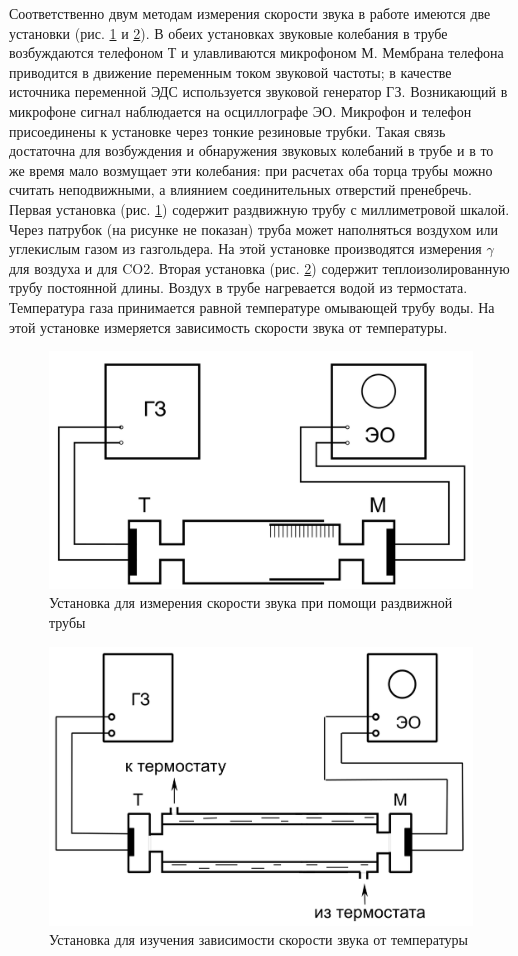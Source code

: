 \documentclass[a4paper,12pt]{article}
\begin{document}
Соответственно двум методам измерения скорости звука в работе имеются две установки (рис. \ref{img:ustan-1} и \ref{img:ustan-2}). В обеих установках звуковые колебания в трубе возбуждаются телефоном Т и улавливаются микрофоном М. Мембрана телефона приводится в движение переменным током звуковой частоты; в качестве источника переменной ЭДС используется звуковой генератор ГЗ. Возникающий в микрофоне сигнал наблюдается на осциллографе ЭО. Микрофон и телефон присоединены к установке через тонкие резиновые трубки. Такая связь достаточна для возбуждения и обнаружения звуковых колебаний в трубе и в то же время мало возмущает эти колебания: при расчетах оба торца трубы можно считать неподвижными, а влиянием соединительных отверстий пренебречь. Первая установка (рис. \ref{img:ustan-1}) содержит раздвижную трубу с миллиметровой шкалой. Через патрубок (на рисунке не показан) труба может наполняться воздухом или углекислым газом из газгольдера. На этой установке производятся измерения $\gamma$ для воздуха и для CO2. Вторая установка (рис. \ref{img:ustan-2}) содержит теплоизолированную трубу постоянной длины. Воздух в трубе нагревается водой из термостата. Температура газа принимается равной температуре омывающей трубу воды. На этой установке измеряется зависимость скорости звука от температуры.

\begin{figure}[!h]
    \centering
    \includegraphics[width=9.5 cm]{ustan-1.png}
    \caption{Установка для измерения скорости звука при помощи раздвижной трубы}
    \label{img:ustan-1}
\end{figure}

\begin{figure}[!h]
    \centering
    \includegraphics[width=9.5 cm]{ustan-2.png}
    \caption{Установка для изучения зависимости скорости звука от температуры}
    \label{img:ustan-2}
\end{figure}
\end{document}
